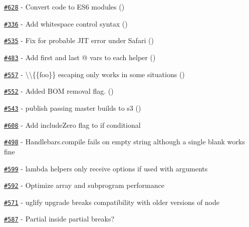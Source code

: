\begin{DoxyItemize}
\item \href{https://github.com/wycats/handlebars.js/pull/628}{\tt \#628} -\/ Convert code to E\+S6 modules (\href{https://api.github.com/users/kpdecker}{\tt })
\item \href{https://github.com/wycats/handlebars.js/pull/336}{\tt \#336} -\/ Add whitespace control syntax (\href{https://api.github.com/users/kpdecker}{\tt })
\item \href{https://github.com/wycats/handlebars.js/pull/535}{\tt \#535} -\/ Fix for probable J\+I\+T error under Safari (\href{https://api.github.com/users/sorentwo}{\tt })
\item \href{https://github.com/wycats/handlebars.js/issues/483}{\tt \#483} -\/ Add first and last @ vars to each helper (\href{https://api.github.com/users/denniskuczynski}{\tt })
\item \href{https://github.com/wycats/handlebars.js/pull/557}{\tt \#557} -\/ {\ttfamily \textbackslash{}\textbackslash{}\{\{foo\}\}} escaping only works in some situations (\href{https://api.github.com/users/dmarcotte}{\tt })
\item \href{https://github.com/wycats/handlebars.js/pull/552}{\tt \#552} -\/ Added B\+O\+M removal flag. (\href{https://api.github.com/users/blessenm}{\tt })
\item \href{https://github.com/wycats/handlebars.js/pull/543}{\tt \#543} -\/ publish passing master builds to s3 (\href{https://api.github.com/users/fivetanley}{\tt })
\item \href{https://github.com/wycats/handlebars.js/issues/608}{\tt \#608} -\/ Add {\ttfamily include\+Zero} flag to {\ttfamily if} conditional
\item \href{https://github.com/wycats/handlebars.js/issues/498}{\tt \#498} -\/ {\ttfamily Handlebars.\+compile} fails on empty string although a single blank works fine
\item \href{https://github.com/wycats/handlebars.js/issues/599}{\tt \#599} -\/ lambda helpers only receive options if used with arguments
\item \href{https://github.com/wycats/handlebars.js/issues/592}{\tt \#592} -\/ Optimize array and subprogram performance
\item \href{https://github.com/wycats/handlebars.js/issues/571}{\tt \#571} -\/ uglify upgrade breaks compatibility with older versions of node
\item \href{https://github.com/wycats/handlebars.js/issues/587}{\tt \#587} -\/ Partial inside partial breaks?
\end{DoxyItemize}

